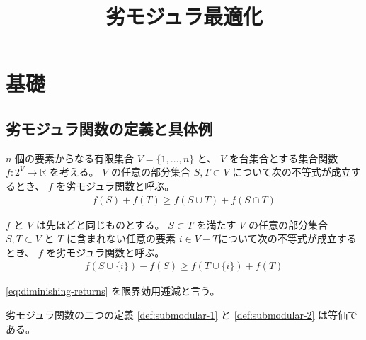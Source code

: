 \documentclass{classes/report}
\begin{document}
\title{劣モジュラ最適化}
\maketitle
\tableofcontents

\chapter{基礎}

\section{劣モジュラ関数の定義と具体例}

\begin{tcolorbox}
\begin{Def}[劣モジュラ関数　その１] \label{def:submodular-1}
    $n$ 個の要素からなる有限集合 $V=\{1, \dots, n\}$ と、 $V$ を台集合とする集合関数 $f: 2^V \to \mathbb{R}$ を考える。
    $V$ の任意の部分集合 $S, T \subset V$ について次の不等式が成立するとき、 $f$ を劣モジュラ関数と呼ぶ。
    \begin{align}
        f(S) + f(T) \ge f(S \cup T) + f(S \cap T) \label{eq:def-submodular}
    \end{align}
\end{Def}

\begin{Def}[劣モジュラ関数　その２] \label{def:submodular-2}
    $f$ と $V$ は先ほどと同じものとする。
    $S \subset T$ を満たす $V$ の任意の部分集合 $S, T \subset V$ と $T$ に含まれない任意の要素 $i \in V - T$について次の不等式が成立するとき、 $f$ を劣モジュラ関数と呼ぶ。
    \begin{align}
        f(S \cup \{i\}) - f(S) \ge f(T \cup \{i\}) + f(T) \label{eq:diminishing-returns}
    \end{align}
\end{Def}

\ref{eq:diminishing-returns} を限界効用逓減と言う。
\end{tcolorbox}

\begin{thm}[二つの定義の等価性]
    劣モジュラ関数の二つの定義 \ref{def:submodular-1} と \ref{def:submodular-2} は等価である。
\end{thm}
\end{document}
